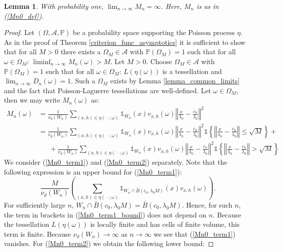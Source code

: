 \documentclass{article}
\newcommand{\PP}{\mathbb{P}}
\newcommand{\blank}{{\mspace{2mu}\cdot\mspace{2mu}}}
\theoremstyle{plain}
\newtheorem{lemma}{Lemma}
\theoremstyle{remark}
\theoremstyle{definition}
\begin{document}
\begin{lemma}\label{Mn0_limit_lemma}
    With probability one, $\lim_{n \to \infty} M_n = \infty$. Here, $M_n$ is as in (\ref{Mn0_def}).
\end{lemma}
\begin{proof}
Let $(\Omega,\mathcal{A},\PP)$ be a probability space supporting the Poisson process $\eta$. As in the proof of Theorem \ref{criterion_func_asymptotics} it is sufficient to show that for all $M > 0$ there exists a $\Omega_M \in \mathcal{A}$ with $\PP(\Omega_M)=1$ such that for all $\omega \in \Omega_M$: $\liminf_{n \to \infty}M_n(\omega) > M$. Let $M > 0$. Choose $\Omega_M \in \mathcal{A}$ with $\PP(\Omega_M)=1$ such that for all $\omega \in \Omega_M$: $L(\eta(\omega))$ is a tessellation and $\lim_{n \to \infty}D_n(\omega)=1$. Such a $\Omega_M$ exists by Lemma \ref{lemma_common_limits} and the fact that Poisson-Laguerre tessellations are well-defined. Let $\omega \in \Omega_M$, then we may write $M_n(\omega)$ as:
{\allowdisplaybreaks
\begin{align}
        M_n(\omega) &= \frac{1}{\nu_d(W_n)}\sum_{(x,h) \in \eta(\blank;\omega)} \mathds{1}_{W_n}(x)v_{x,h}(\omega)\left\Vert \frac{x}{\lambda_0} - \frac{c_0}{\lambda_0} \right\Vert^2 \nonumber \\
        &= \frac{1}{\nu_d(W_n)}\sum_{(x,h) \in \eta(\blank;\omega)} \mathds{1}_{W_n}(x)v_{x,h}(\omega)\left\Vert \frac{x}{\lambda_0} - \frac{c_0}{\lambda_0} \right\Vert^2 \mathds{1}\left\{\left\Vert \frac{x}{\lambda_0} - \frac{c_0}{\lambda_0} \right\Vert\leq \sqrt{M} \right\} + \label{Mn0_term1}\\
        &\phantom{=} \ + \frac{1}{\nu_d(W_n)}\sum_{(x,h) \in \eta(\blank;\omega)} \mathds{1}_{W_n}(x)v_{x,h}(\omega)\left\Vert \frac{x}{\lambda_0} - \frac{c_0}{\lambda_0} \right\Vert^2 \mathds{1}\left\{\left\Vert \frac{x}{\lambda_0} - \frac{c_0}{\lambda_0} \right\Vert > \sqrt{M} \right\} \label{Mn0_term2}
    \end{align}
}%
    We consider (\ref{Mn0_term1}) and (\ref{Mn0_term2}) separately. Note that the following expression is an upper bound for (\ref{Mn0_term1}):
    \begin{equation}
      \frac{M}{\nu_d(W_n)}\left(\sum_{(x,h) \in \eta(\blank;\omega)} \mathds{1}_{W_n \cap \bar{B}(c_0,\lambda_0 M)}(x)v_{x,h}(\omega)\right).\label{Mn0_term1_bound}
    \end{equation}
    For sufficiently large $n$, $W_n \cap \bar{B}(c_0,\lambda_0 M) = \bar{B}(c_0,\lambda_0 M)$. Hence, for such $n$, the term in brackets in (\ref{Mn0_term1_bound}) does not depend on $n$. Because the tessellation $L(\eta(\omega))$ is locally finite and has cells of finite volume, this term is finite. Because $\nu_d(W_n) \to \infty$ as $n \to \infty$ we see that (\ref{Mn0_term1}) vanishes. For (\ref{Mn0_term2}) we obtain the following lower bound:

\end{proof}
\end{document}
